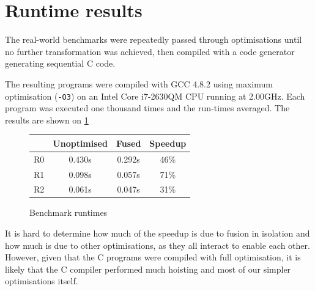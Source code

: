 \section{Runtime results}
\label{sec:runtime-results}

The real-world benchmarks were repeatedly passed through \LO{}
optimisations until no further transformation was achieved, then
compiled with a code generator generating sequential C code.

The resulting programs were compiled with GCC 4.8.2 using maximum
optimisation (\texttt{-O3}) on an Intel Core i7-2630QM CPU running at
2.00GHz.  Each program was executed one thousand times and the
run-times averaged.  The results are shown on \cref{fig:speedups}

\begin{figure}
\begin{center}
\begin{tabular}{l|c|c|c}
   & \textbf{Unoptimised} & \textbf{Fused} & \textbf{Speedup} \\\hline
R0 & 0.430s & 0.292s & 46\% \\
R1 & 0.098s & 0.057s & 71\% \\
R2 & 0.061s & 0.047s & 31\%
\end{tabular}
\end{center}

\caption{Benchmark runtimes}

\label{fig:speedups}
\end{figure}

It is hard to determine how much of the speedup is due to fusion in
isolation and how much is due to other optimisations, as they all
interact to enable each other.  However, given that the C programs
were compiled with full optimisation, it is likely that the C compiler
performed much hoisting and most of our simpler optimisations itself.

